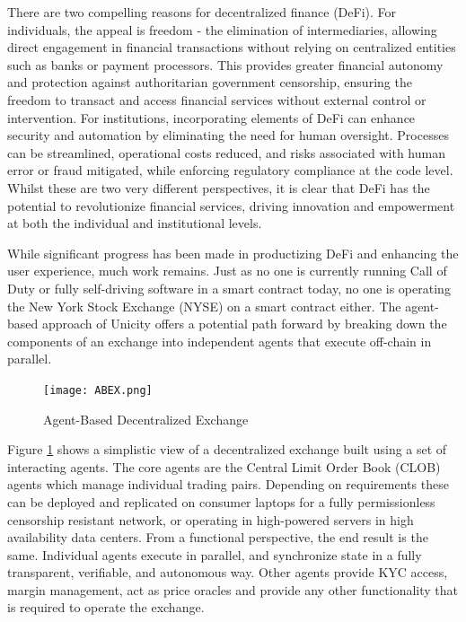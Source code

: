 \documentclass{article}
\begin{document}
There are two compelling reasons for decentralized finance (DeFi). For individuals, the appeal is freedom - the elimination of intermediaries, allowing direct engagement in financial transactions without relying on centralized entities such as banks or payment processors. This provides greater financial autonomy and protection against authoritarian government censorship, ensuring the freedom to transact and access financial services without external control or intervention. For institutions, incorporating elements of DeFi can enhance security and automation by eliminating the need for human oversight. Processes can be streamlined, operational costs reduced, and risks associated with human error or fraud mitigated, while enforcing regulatory compliance at the code level. Whilst these are two very different perspectives, it is clear that DeFi has the potential to revolutionize financial services, driving innovation and empowerment at both the individual and institutional levels.



While significant progress has been made in productizing DeFi and enhancing the user experience, much work remains. Just as no one is currently running Call of Duty or fully self-driving software in a smart contract today, no one is operating the New York Stock Exchange (NYSE) on a smart contract either. The agent-based approach of Unicity offers a potential path forward by breaking down the components of an exchange into independent agents that execute off-chain in parallel.

\begin{figure}[H]
    \centering
    \texttt{[image: ABEX.png]}
    \caption{Agent-Based Decentralized Exchange}
    \label{fig:ABEX}
\end{figure}


Figure \ref{fig:ABEX} shows a simplistic view of a decentralized exchange built using a set of interacting agents. The core agents are the Central Limit Order Book (CLOB) agents which manage individual trading pairs. Depending on requirements these can be deployed and replicated on consumer laptops for a fully permissionless censorship resistant network, or operating in high-powered servers in high availability data centers. From a functional perspective, the end result is the same. Individual agents execute in parallel, and synchronize state in a fully transparent, verifiable, and autonomous way. Other agents provide KYC access, margin management, act as price oracles and provide any other functionality that is required to operate the exchange.
\end{document}
